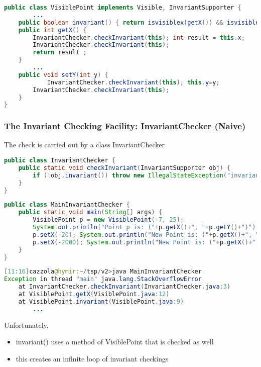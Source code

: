\begin{lstlisting}[language=Java]
public class VisiblePoint implements Visible, InvariantSupporter {
		...
	public boolean invariant() { return isvisiblex(getX()) && isvisibley(getY()) ; }
	public int getX() {
		InvariantChecker.checkInvariant(this); int result = this.x;
		InvariantChecker.checkInvariant(this);
		return result ;
	}
		...
	public void setY(int y) {
			InvariantChecker.checkInvariant(this); this.y=y;
		InvariantChecker.checkInvariant(this);
	}
}
\end{lstlisting}

\subsubsection{The Invariant Checking Facility: InvariantChecker (Naive)}

The check is carried out by a class InvariantChecker

\begin{lstlisting}[language=Java]
public class InvariantChecker {
	public static void checkInvariant(InvariantSupporter obj) {
		if (!obj.invariant()) throw new IllegalStateException("invariant failure");
	}
}
\end{lstlisting}

\begin{lstlisting}[language=Java]
public class MainInvariantChecker {
	public static void main(String[] args) {
		VisiblePoint p = new VisiblePoint(-7, 25);
		System.out.println("Point p is: ("+p.getX()+", "+p.getY()+")");
		p.setX(-20); System.out.println("New Point is: ("+p.getX()+", "+p.getY()+")");
		p.setX(-2000); System.out.println("New Point is: ("+p.getX()+", "+p.getY()+")");
	}
}
\end{lstlisting}

\begin{lstlisting}[language=Java]
[11:16]cazzola@hymir:~/tsp/v2>java MainInvariantChecker
Exception in thread "main" java.lang.StackOverflowError
	at InvariantChecker.checkInvariant(InvariantChecker.java:3)
	at VisiblePoint.getX(VisiblePoint.java:12)
	at VisiblePoint.invariant(VisiblePoint.java:9)
		...
\end{lstlisting}

Unfortunately,
\begin{itemize}
	\item invariant() uses a method of VisiblePoint that is checked as well
	\item this creates an infinite loop of invariant checkings
\end{itemize}

